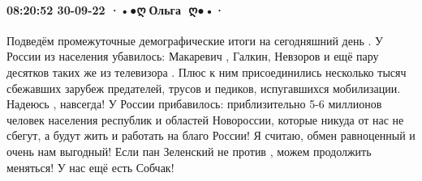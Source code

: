 \paragraph{08:20:52 30-09-22 ·•●ღ🌸Ольга 🌸ღ●•·}

Подведём промежуточные демографические итоги на сегодняшний день .
У России из населения убавилось: Макаревич , Галкин, Невзоров и ещё пару десятков таких же из телевизора . Плюс к ним присоединились несколько тысяч сбежавших зарубеж предателей, трусов и педиков, испугавшихся мобилизации. Надеюсь , навсегда!
У России прибавилось: приблизительно 5-6 миллионов человек населения республик и областей Новороссии, которые никуда от нас не сбегут, а будут жить и работать на благо России!
Я считаю, обмен равноценный и очень нам выгодный! Если пан Зеленский не против , можем продолжить меняться! У нас ещё есть Собчак!
